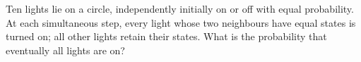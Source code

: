 Ten lights lie on a circle, independently initially on or off with equal probability. At each simultaneous step, every light whose two neighbours have equal states is turned on; all other lights retain their states. What is the probability that eventually all lights are on?
